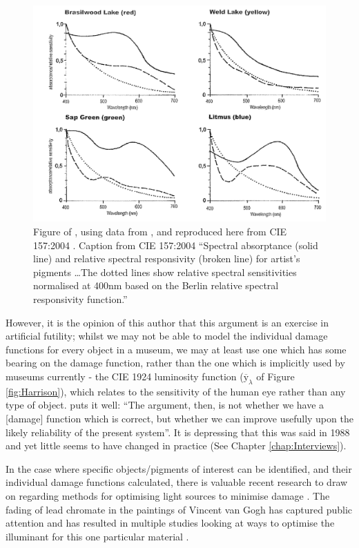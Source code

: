 \begin{figure}[htbp]
\includegraphics[max width=\textwidth]{figs/LitRev/Cuttle.png}
\caption{Figure of \citet{cuttle_control_1999}, using data from \citet{saunders_wavelength-dependent_1994}, and reproduced here from CIE 157:2004 \citep{cie_cie_2004}. Caption from CIE 157:2004 ``Spectral absorptance (solid line) and relative spectral responsivity (broken line) for artist's pigments \dots The dotted lines show relative spectral sensitivities normalised at 400nm based on the Berlin relative spectral responsivity function.''}
\label{fig:Cuttle}
\end{figure}

However, it is the opinion of this author that this argument is an exercise in artificial futility; whilst we may not be able to model the individual damage functions for every object in a museum, we may at least use one which has some bearing on the damage function, rather than the one which is implicitly used by museums currently - the CIE 1924 luminosity function ($\overline{\mathrm{y}}_{\lambda}$ of Figure \ref{fig:Harrison}), which relates to the sensitivity of the human eye rather than any type of object. \citet{cuttle_lighting_1988} puts it well: ``The argument, then, is not whether we have a [damage] function which is correct, but whether we can improve usefully upon the likely reliability of the present system''. It is depressing that this was said in 1988 and yet little seems to have changed in practice (See Chapter \ref{chap:Interviews}).

In the case where specific objects/pigments of interest can be identified, and their individual damage functions calculated, there is valuable recent research to draw on regarding methods for optimising light sources to minimise damage \citep{durmus_optimising_2017,durmus_colour_2015,durmus_optimising_2015,durmus_object_2017,delgado_ramos_art_2009,delgado_lighting_2011,luna_selective_2015,cuttle_proposal_2000,vazquez_point_2017}. The fading of lead chromate in the paintings of Vincent van Gogh has captured public attention \citep{lewis_smith_will_2013} and has resulted in multiple studies looking at ways to optimise the illuminant for this one particular material \citep{lunz_can_2017,monico_degradation_2011}.

